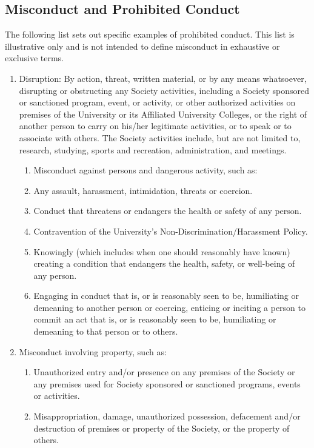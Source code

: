 \subsection{Misconduct and Prohibited Conduct}
The following list sets out specific examples of prohibited conduct. This list is illustrative only and is not intended to define misconduct in exhaustive or exclusive terms.
\begin{enumerate} [align=left]
\item Disruption: By action, threat, written material, or by any means whatsoever, disrupting or obstructing any Society activities, including a Society sponsored or sanctioned program, event, or activity, or other authorized activities on premises of the University or its Affiliated University Colleges, or the right of another person to carry on his/her legitimate activities, or to speak or to associate with others. The Society activities include, but are not limited to, research, studying, sports and recreation, administration, and meetings.
\begin{enumerate} [label*=\arabic*., align=left]
\item Misconduct against persons and dangerous activity, such as:
\item Any assault, harassment, intimidation, threats or coercion.
\item Conduct that threatens or endangers the health or safety of any person.
\item Contravention of the University's Non-Discrimination/Harassment Policy. 
\item Knowingly (which includes when one should reasonably have known) creating a condition that endangers the health, safety, or well-being of any person.
\item Engaging in conduct that is, or is reasonably seen to be, humiliating or demeaning to another person or coercing, enticing or inciting a person to commit an act that is, or is reasonably seen to be, humiliating or demeaning to that person or to others.
\end{enumerate}
\item Misconduct involving property, such as:
\begin{enumerate} [label*=\arabic*., align=left]
\item Unauthorized entry and/or presence on any premises of the Society or any premises used for Society sponsored or sanctioned programs, events or activities.
\item Misappropriation, damage, unauthorized possession, defacement and/or destruction of premises or property of the Society, or the property of others.

\end{enumerate}
\end{enumerate}
